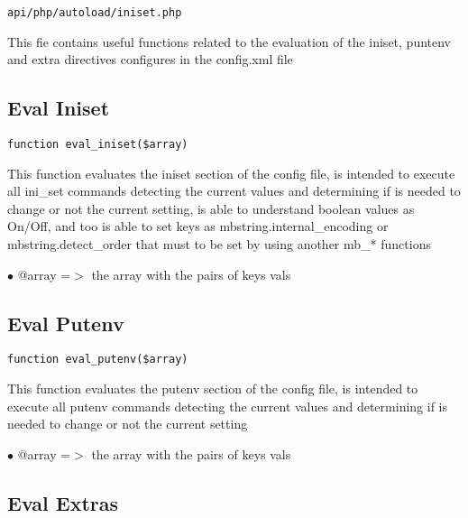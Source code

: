\documentclass[a4paper]{book}
\begin{document}
\begin{lstlisting}
api/php/autoload/iniset.php
\end{lstlisting}

This fie contains useful functions related to the evaluation of the iniset, puntenv and extra
directives configures in the config.xml file

\hypertarget{toc189}{}
\subsection{Eval Iniset}

\begin{lstlisting}
function eval_iniset($array)
\end{lstlisting}

This function evaluates the iniset section of the config file, is intended
to execute all ini\_set commands detecting the current values and determining
if is needed to change or not the current setting, is able to understand
boolean values as On/Off, and too is able to set keys as mbstring.internal\_encoding
or mbstring.detect\_order that must to be set by using another mb\_* functions

\begin{compactitem}
\item[\color{myblue}$\bullet$] @array =$>$ the array with the pairs of keys vals
\end{compactitem}

\hypertarget{toc190}{}
\subsection{Eval Putenv}

\begin{lstlisting}
function eval_putenv($array)
\end{lstlisting}

This function evaluates the putenv section of the config file, is intended
to execute all putenv commands detecting the current values and determining
if is needed to change or not the current setting

\begin{compactitem}
\item[\color{myblue}$\bullet$] @array =$>$ the array with the pairs of keys vals
\end{compactitem}

\hypertarget{toc191}{}
\subsection{Eval Extras}
\end{document}
